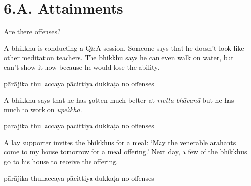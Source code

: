 \chapter{6.A. Attainments}
\renewcommand*{\theChapterTitle}{6.A. Attainments}

\begin{exam}{\autoExamName}

\begin{problem*}

  Are there offenses?

\begin{parts}

\item A bhikkhu is conducting a Q\&A session.
  Someone says that he doesn't look like other meditation teachers.
  The bhikkhu says he can even walk on water, but can't show it now because he would lose the ability.

  \bigskip

  \begin{answers}{5}
    \bChoices
     pārājika\eAns
     thullaccaya\eAns
     pācittiya\eAns
     dukkaṭa\eAns
     no offenses\eAns
    \eChoices
  \end{answers}

  \bigskip

\item A bhikkhu says that he has gotten much better at \emph{metta-bhāvanā} but
  he has much to work on \textit{upekkhā}.

  \bigskip

  \begin{answers}{5}
    \bChoices
     pārājika\eAns
     thullaccaya\eAns
     pācittiya\eAns
     dukkaṭa\eAns
     no offenses\eAns
    \eChoices
  \end{answers}

  \bigskip

\item A lay supporter invites the bhikkhus for a meal: `May the venerable
  arahants come to my house tomorrow for a meal offering.' Next day, a few of
  the bhikkhus go to his house to receive the offering.

  \bigskip

  \begin{answers}{5}
    \bChoices
     pārājika\eAns
     thullaccaya\eAns
     pācittiya\eAns
     dukkaṭa\eAns
     no offenses\eAns
    \eChoices
  \end{answers}


\end{parts}
\end{problem*}
\end{exam}
